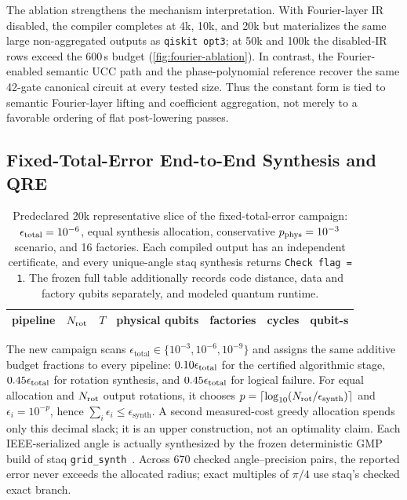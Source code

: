 \documentclass[a4paper,twocolumn,10pt,unpublished]{quantumarticle}
\begin{document}
The ablation strengthens the mechanism interpretation. With Fourier-layer
IR disabled, the compiler completes at 4k, 10k, and 20k but materializes
the same large non-aggregated outputs as \texttt{qiskit opt3}; at 50k
and 100k the disabled-IR rows exceed the 600\,s budget
(\cref{fig:fourier-ablation}). In contrast, the Fourier-enabled semantic
UCC path and the phase-polynomial reference recover the same 42-gate
canonical circuit at every tested size. Thus the constant form is tied
to semantic Fourier-layer lifting and coefficient aggregation, not
merely to a favorable ordering of flat post-lowering passes.

\subsection{Fixed-Total-Error End-to-End Synthesis and QRE}

\begin{table}[t]
\centering
\scriptsize
\begin{tabular}{l r r r r r r}
\toprule
pipeline & $N_{\rm rot}$ & $T$ & physical qubits & factories & cycles & qubit-s \\
\midrule

\end{tabular}
\caption{Predeclared 20k representative slice of the fixed-total-error
campaign: $\epsilon_{\rm total}=10^{-6}$, equal synthesis allocation,
conservative $p_{\rm phys}=10^{-3}$ scenario, and 16 factories.  Each compiled
output has an independent certificate, and every unique-angle staq synthesis
returns \texttt{Check flag = 1}.  The frozen full table additionally records
code distance, data and factory qubits separately, and modeled quantum runtime.}
\label{tab:resource-consequence}
\end{table}

The new campaign scans
$\epsilon_{\mathrm{total}}\in\{10^{-3},10^{-6},10^{-9}\}$ and assigns the
same additive budget fractions to every pipeline:
$0.10\epsilon_{\rm total}$ for the certified algorithmic stage,
$0.45\epsilon_{\rm total}$ for rotation synthesis, and
$0.45\epsilon_{\rm total}$ for logical failure.  For equal allocation and
$N_{\rm rot}$ output rotations, it chooses
$p=\lceil\log_{10}(N_{\rm rot}/\epsilon_{\mathrm{synth}})\rceil$ and
$\epsilon_i=10^{-p}$, hence
$\sum_i\epsilon_i\leq\epsilon_{\mathrm{synth}}$.  A second measured-cost
greedy allocation spends only this decimal slack; it is an upper construction,
not an optimality claim.  Each IEEE-serialized angle is actually synthesized
by the frozen deterministic GMP build of staq
\texttt{grid\_synth}~\cite{amy2020staq,ross2016optimal}.  Across
670 checked angle--precision pairs, the reported error never exceeds the
allocated radius; exact multiples of $\pi/4$ use staq's checked exact branch.
\end{document}
